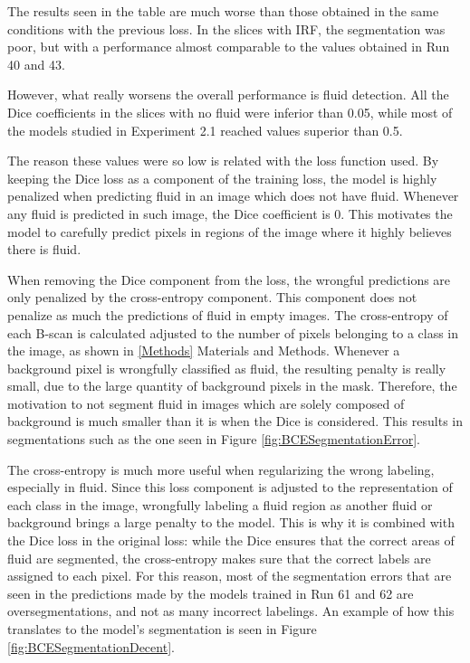 The results seen in the table are much worse than those obtained in the same conditions with the previous loss. In the slices with IRF, the segmentation was poor, but with a performance almost comparable to the values obtained in Run 40 and 43.
\par
However, what really worsens the overall performance is fluid detection. All the Dice coefficients in the slices with no fluid were inferior than 0.05, while most of the models studied in Experiment 2.1 reached values superior than 0.5.
\par
The reason these values were so low is related with the loss function used. By keeping the Dice loss as a component of the training loss, the model is highly penalized when predicting fluid in an image which does not have fluid. Whenever any fluid is predicted in such image, the Dice coefficient is 0. This motivates the model to carefully predict pixels in regions of the image where it highly believes there is fluid.
\par
When removing the Dice component from the loss, the wrongful predictions are only penalized by the cross-entropy component. This component does not penalize as much the predictions of fluid in empty images. The cross-entropy of each B-scan is calculated adjusted to the number of pixels belonging to a class in the image, as shown in \ref{Methods} Materials and Methods. Whenever a background pixel is wrongfully classified as fluid, the resulting penalty is really small, due to the large quantity of background pixels in the mask. Therefore, the motivation to not segment fluid in images which are solely composed of background is much smaller than it is when the Dice is considered. This results in segmentations such as the one seen in Figure \ref{fig:BCESegmentationError}.
\par
The cross-entropy is much more useful when regularizing the wrong labeling, especially in fluid. Since this loss component is adjusted to the representation of each class in the image, wrongfully labeling a fluid region as another fluid or background brings a large penalty to the model. This is why it is combined with the Dice loss in the original loss: while the Dice ensures that the correct areas of fluid are segmented, the cross-entropy makes sure that the correct labels are assigned to each pixel. For this reason, most of the segmentation errors that are seen in the predictions made by the models trained in Run 61 and 62 are oversegmentations, and not as many incorrect labelings. An example of how this translates to the model's segmentation is seen in Figure \ref{fig:BCESegmentationDecent}.

